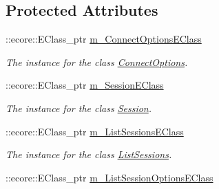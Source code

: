 \subsection*{Protected Attributes}
\begin{DoxyCompactItemize}
\item 
\hypertarget{classUMS__Data_1_1UMS__DataPackage_ab1a0e1c3453703506af35cd059816d13}{
::ecore::EClass\_\-ptr \hyperlink{classUMS__Data_1_1UMS__DataPackage_ab1a0e1c3453703506af35cd059816d13}{m\_\-ConnectOptionsEClass}}
\label{classUMS__Data_1_1UMS__DataPackage_ab1a0e1c3453703506af35cd059816d13}

\begin{DoxyCompactList}\small\item\em The instance for the class \hyperlink{classUMS__Data_1_1ConnectOptions}{ConnectOptions}. \item\end{DoxyCompactList}\item 
\hypertarget{classUMS__Data_1_1UMS__DataPackage_a5f8e02a8a96cfc52b1f89ffacaff5539}{
::ecore::EClass\_\-ptr \hyperlink{classUMS__Data_1_1UMS__DataPackage_a5f8e02a8a96cfc52b1f89ffacaff5539}{m\_\-SessionEClass}}
\label{classUMS__Data_1_1UMS__DataPackage_a5f8e02a8a96cfc52b1f89ffacaff5539}

\begin{DoxyCompactList}\small\item\em The instance for the class \hyperlink{classUMS__Data_1_1Session}{Session}. \item\end{DoxyCompactList}\item 
\hypertarget{classUMS__Data_1_1UMS__DataPackage_accc1f69b167e9b67f58f29d91640d881}{
::ecore::EClass\_\-ptr \hyperlink{classUMS__Data_1_1UMS__DataPackage_accc1f69b167e9b67f58f29d91640d881}{m\_\-ListSessionsEClass}}
\label{classUMS__Data_1_1UMS__DataPackage_accc1f69b167e9b67f58f29d91640d881}

\begin{DoxyCompactList}\small\item\em The instance for the class \hyperlink{classUMS__Data_1_1ListSessions}{ListSessions}. \item\end{DoxyCompactList}\item 
\hypertarget{classUMS__Data_1_1UMS__DataPackage_ae64107d4f8ca58c05867c8b0f54a47b9}{
::ecore::EClass\_\-ptr \hyperlink{classUMS__Data_1_1UMS__DataPackage_ae64107d4f8ca58c05867c8b0f54a47b9}{m\_\-ListSessionOptionsEClass}}
\label{classUMS__Data_1_1UMS__DataPackage_ae64107d4f8ca58c05867c8b0f54a47b9}


\end{DoxyCompactItemize}
